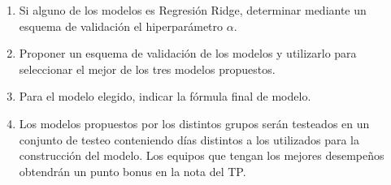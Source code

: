 \documentclass[a4paper,11pt]{article}
\theoremstyle{definition}
\begin{document}
\begin{enumerate}
\begin{enumerate}
\item Si alguno de los modelos es Regresi\'on Ridge, determinar mediante un esquema de validaci\'on el hiperpar\'ametro $\alpha$.

\item Proponer un esquema de validaci\'on de los modelos y utilizarlo para seleccionar el mejor de los tres modelos propuestos.

\item Para el modelo elegido, indicar la f\'ormula final de modelo.

\item Los modelos propuestos por los distintos grupos ser\'an testeados en un conjunto de testeo conteniendo d\'ias distintos a los utilizados para la construcci\'on del modelo. Los equipos que tengan los mejores desempe\~nos obtendr\'an un punto bonus en la nota del TP.
\end{enumerate}


\end{enumerate}
\end{document}
